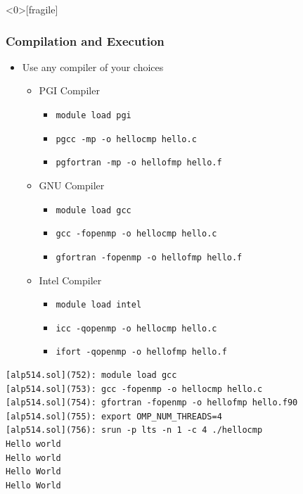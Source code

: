 \documentclass[10pt,t]{beamer}
\begin{document}
\begin{frame}<0>[fragile]
  \frametitle{Compilation and Execution}
  \begin{itemize}
    \item Use any compiler of your choices
      \begin{itemize}
      \item PGI Compiler
        \begin{itemize}
        \item \lstinline[basicstyle=\scriptsize\ttfamily]{module load pgi}
        \item \lstinline[basicstyle=\scriptsize\ttfamily]{pgcc -mp -o hellocmp hello.c}
        \item \lstinline[basicstyle=\scriptsize\ttfamily]{pgfortran -mp -o hellofmp hello.f}
        \end{itemize}
      \item GNU Compiler
        \begin{itemize}
        \item \lstinline[basicstyle=\scriptsize\ttfamily]{module load gcc}
        \item \lstinline[basicstyle=\scriptsize\ttfamily]{gcc -fopenmp -o hellocmp hello.c}
        \item \lstinline[basicstyle=\scriptsize\ttfamily]{gfortran -fopenmp -o hellofmp hello.f}
        \end{itemize}
      \item Intel Compiler
        \begin{itemize}
        \item \lstinline[basicstyle=\scriptsize\ttfamily]{module load intel}
        \item \lstinline[basicstyle=\scriptsize\ttfamily]{icc -qopenmp -o hellocmp hello.c}
        \item \lstinline[basicstyle=\scriptsize\ttfamily]{ifort -qopenmp -o hellofmp hello.f}
        \end{itemize}
      \end{itemize}
  \end{itemize}
  \begin{block}{}
    \begin{lstlisting}[basicstyle=\tiny\ttfamily]
[alp514.sol](752): module load gcc
[alp514.sol](753): gcc -fopenmp -o hellocmp hello.c
[alp514.sol](754): gfortran -fopenmp -o hellofmp hello.f90
[alp514.sol](755): export OMP_NUM_THREADS=4
[alp514.sol](756): srun -p lts -n 1 -c 4 ./hellocmp
Hello world
Hello world
Hello World
Hello World
    \end{lstlisting}
  \end{block}
\end{frame}
\end{document}
